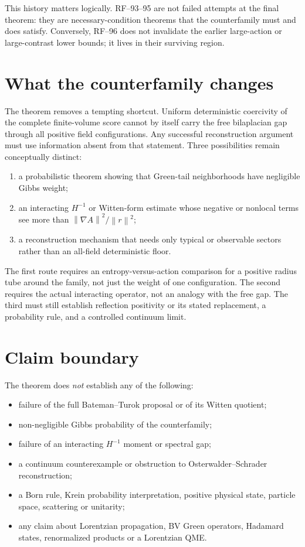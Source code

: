 \documentclass[11pt]{article}
\theoremstyle{remark}
\newcommand{\norm}[1]{\left\lVert#1\right\rVert}
\begin{document}
This history matters logically.  RF--93--95 are not failed attempts at the
final theorem: they are necessary-condition theorems that the counterfamily
must and does satisfy.  Conversely, RF--96 does not invalidate the earlier
large-action or large-contrast lower bounds; it lives in their surviving
region.

\section{What the counterfamily changes}

The theorem removes a tempting shortcut.  Uniform deterministic coercivity
of the complete finite-volume score cannot by itself carry the free
bilaplacian gap through all positive field configurations.  Any successful
reconstruction argument must use information absent from that statement.
Three possibilities remain conceptually distinct:

\begin{enumerate}
\item a probabilistic theorem showing that Green-tail neighborhoods have
negligible Gibbs weight;
\item an interacting \(H^{-1}\) or Witten-form estimate whose negative or
nonlocal terms see more than \(\norm{\nabla A}^2/\norm{r}^2\);
\item a reconstruction mechanism that needs only typical or observable
sectors rather than an all-field deterministic floor.
\end{enumerate}

The first route requires an entropy-versus-action comparison for a positive
radius tube around the family, not just the weight of one configuration.  The
second requires the actual interacting operator, not an analogy with the
free gap.  The third must still establish reflection positivity or its stated
replacement, a probability rule, and a controlled continuum limit.

\section{Claim boundary}

The theorem does \emph{not} establish any of the following:
\begin{itemize}
\item failure of the full Bateman--Turok proposal or of its Witten quotient;
\item non-negligible Gibbs probability of the counterfamily;
\item failure of an interacting \(H^{-1}\) moment or spectral gap;
\item a continuum counterexample or obstruction to Osterwalder--Schrader
reconstruction;
\item a Born rule, Krein probability interpretation, positive physical state,
particle space, scattering or unitarity;
\item any claim about Lorentzian propagation, BV Green operators, Hadamard
states, renormalized products or a Lorentzian QME.
\end{itemize}
\end{document}
